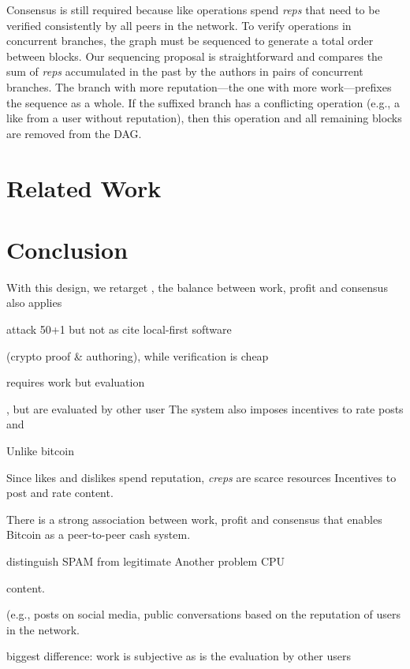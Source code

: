 \documentclass[10pt,journal,compsoc]{IEEEtran}
\newcommand{\reps} {\emph{reps}\xspace}
\begin{document}
Consensus is still required because like operations spend \reps that need
to be verified consistently by all peers in the network.
To verify operations in concurrent branches, the graph must be sequenced to
generate a total order between blocks.
Our sequencing proposal is straightforward and compares the sum of \reps
accumulated in the past by the authors in pairs of concurrent branches.
The branch with more reputation---the one with more work---prefixes the
sequence as a whole.
If the suffixed branch has a conflicting operation (e.g., a like from a user
without reputation), then this operation and all remaining blocks are removed
from the DAG.

\section{Related Work}
\label{sec.related}

\section{Conclusion}
\label{sec.conclusion}



With this design, we retarget  , the balance between work, profit and consensus also applies 

attack 50+1 but not as
cite local-first software

 (crypto proof \& authoring),
while verification is cheap


requires work but evaluation


, but
are evaluated by other user
The system also imposes incentives to rate posts and 

Unlike bitcoin

Since likes and dislikes spend reputation, \emph{creps} are scarce resources
Incentives to post and rate content.

There is a strong association between work, profit and consensus that enables
Bitcoin as a peer-to-peer cash system.

distinguish SPAM from legitimate
Another problem CPU



content.



 (e.g., posts on social media, public conversations
based on the reputation of users
in the network.


biggest difference:
work is subjective as is the evaluation by other users
\end{document}
